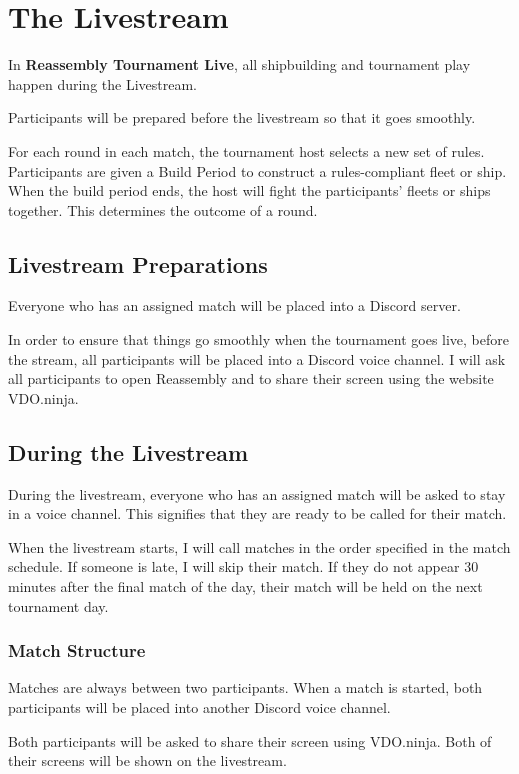 \documentclass[11pt]{article}
\newcommand{\RTL}{\textbf{Reassembly Tournament Live}}
\begin{document}
\section{The Livestream}
In \RTL{}, all shipbuilding and tournament play happen during the Livestream.

Participants will be prepared before the livestream so that it goes smoothly.

For each round in each match, the tournament host selects a new set of rules. Participants are
given a Build Period to construct a rules-compliant fleet or ship. When the build period ends,
the host will fight the participants' fleets or ships together. This determines the outcome of
a round.

\subsection{Livestream Preparations}
Everyone who has an assigned match will be placed into a Discord server. 

In order to ensure that things go smoothly when the tournament goes live, before the stream, 
all participants will be placed into a Discord voice channel. I will ask all participants to open 
Reassembly and to share their screen using the website VDO.ninja.

\subsection{During the Livestream}
During the livestream, everyone who has an assigned match will be asked to stay in a voice
channel. This signifies that they are ready to be called for their match. 

When the livestream starts, I will call matches in the order specified in the match schedule.
If someone is late, I will skip their match. If they do not appear
30 minutes after the final match of the day, their match will be held on the next tournament day.

\subsubsection{Match Structure}
Matches are always between two participants.
When a match is started, both participants will be placed into another Discord voice channel.

Both participants will be asked to share their screen using VDO.ninja. Both of their screens 
will be shown on the livestream.
\end{document}
